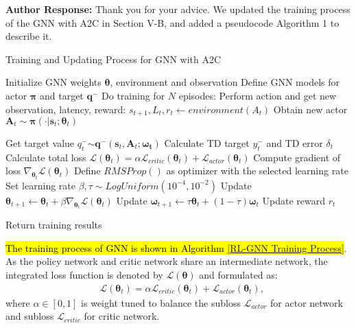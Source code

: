 \documentclass{ar2rc}
\newcommand{\highlight}[1]{\sethlcolor{yellow!50}\hl{#1}}
\begin{document}
\textbf{Author Response:} Thank you for your advice. We updated the training process of the GNN with A2C in Section V-B, and added a pseudocode Algorithm 1 to describe it. 

\begin{algorithm}
   \caption{Training and Updating Process for GNN with A2C}
   \begin{algorithmic}[1]\label{RL-GNN Training Process}
   \STATE Initialize GNN weights $\boldsymbol{\theta}$, environment and observation
   \STATE Define GNN models for actor $\boldsymbol{\pi}$ and target $\boldsymbol{q}^{-}$
   \STATE Do training for $N$ episodes:
      \STATE Perform action and get new observation, latency, reward: $s_{t+1}, L_{t}, r_{t} \leftarrow environment(A_{t})$
      \STATE Obtain new actor $\mathbf{A}_t \sim \boldsymbol{\pi}(\cdot|\boldsymbol{s}_t; \boldsymbol{\theta}_t)$
   
 
      \STATE Get target value $q^-_t$$\sim $$\boldsymbol{q}^{-}\left(\boldsymbol{s}_t, \mathbf{A}_t;\boldsymbol{\omega_t}\right)$
      \STATE Calculate TD target $y^-_t $ and TD error $\delta_t$
      \STATE Calculate total loss $\mathcal{L}(\boldsymbol{\theta}_t) = \alpha \mathcal{L}_{critic}(\boldsymbol{\theta}_t) + \mathcal{L}_{actor}(\boldsymbol{\theta}_t)$
      \STATE Compute gradient of loss $\nabla_{\boldsymbol{\theta}_t} \mathcal{L}(\boldsymbol{\theta}_t)$
      \STATE Define $RMSProp()$ as optimizer with the selected learning rate
		\STATE Set learning rate $\beta, \tau \sim \mathit{LogUniform}(10^{-4}, 10^{-2})$
      \STATE Update $\boldsymbol{\theta}_{t+1} \leftarrow \boldsymbol{\theta}_t + \beta \nabla_{\boldsymbol{\theta}_t} \mathcal{L}(\boldsymbol{\theta}_t)$
      \STATE Update $\boldsymbol{\omega}_{t+1} \leftarrow \tau \boldsymbol{\theta}_t + (1 - \tau) \boldsymbol{\omega}_t$
      \STATE Update reward $r_t$
 
   \ENDFOR
   
   \STATE Return training results
   
   \end{algorithmic}
   \end{algorithm}




   \highlight{The training process of GNN is shown in Algorithm \ref{RL-GNN Training Process}}. As the policy network and critic network share an intermediate network, the integrated loss function is denoted by $\mathcal{L}(\boldsymbol{\theta})$ and formulated as:
\begin{align} \label{total loss}
    & \mathcal{L}(\boldsymbol{\theta}_t)=\alpha\mathcal{L}_{critic}(\boldsymbol{\theta}_t)+\mathcal{L}_{actor}(\boldsymbol{\theta}_t), \tag{21}
\end{align}
where $\alpha$$\in$$[0,1]$ is weight tuned to balance the subloss $\mathcal{L}_{actor}$ for actor network and subloss $\mathcal{L}_{critic}$ for critic network. 
\end{document}
